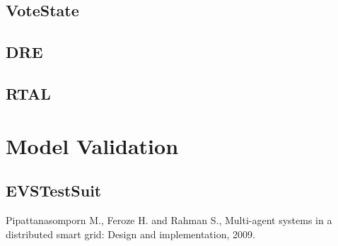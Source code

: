 \documentclass{article}
\begin{document}
\subsection{VoteState}

\subsection{DRE}

\subsection{RTAL}

\section{Model Validation}
\subsection{EVSTestSuit}

\renewcommand{\refname}{\section{Bibliography}} 
\begin{thebibliography}{99}
Pipattanasomporn M., Feroze H. and Rahman S., Multi-agent systems in a distributed smart grid: Design and implementation, 2009.
\end{thebibliography}
\end{document}
